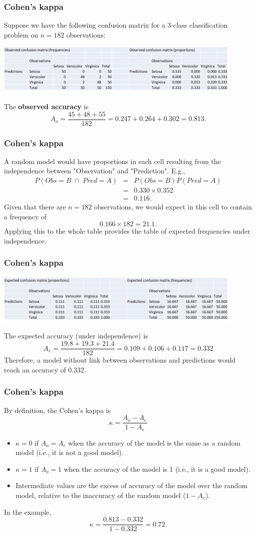 \begin{frame}
\frametitle{Cohen's kappa}
Suppose we have the following confusion matrix for a 3-class classification problem on $n=182$ observations:
\begin{center}
\includegraphics[width=12cm]{../Graphs/Kappa_Obs.png}
\end{center}
The {\bf observed accuracy} is 
$$
A_o = \frac{45+48+55}{182} = 0.247 + 0.264 + 0.302 = 0.813.
$$ 
\end{frame}
\begin{frame}
\frametitle{Cohen's kappa}
A random model would have proportions in each cell resulting from the independence between "Observation" and "Prediction". E.g.,
\begin{eqnarray*}
P(Obs=B\; \cap\; Pred=A) &=& P(Obs=B)P(Pred=A)\\
&=& 0.330 \times 0.352\\ 
&=& 0.116.
\end{eqnarray*}
Given that there are $n=182$ observations, we would expect in this cell to contain a frequency of
$$
0.166 \times 182 = 21.1.
$$
Applying this to the whole table provides the table of expected frequencies under independence.
\end{frame}
\begin{frame}
\frametitle{Cohen's kappa}
\begin{center}
\includegraphics[width=12cm]{../Graphs/Kappa_Exp.png}
\end{center}
The expected accuracy (under independence) is 
$$
A_e = \frac{19.8+19.3+21.4}{182} = 0.109 + 0.106 + 0.117 = 0.332
$$ 
Therefore, a model without link between observations and predictions would reach an accuracy of 0.332.  
\end{frame}
\begin{frame}
\frametitle{Cohen's kappa}
By definition, the Cohen's kappa is
$$
\kappa = \frac{A_o - A_e}{1-A_e} 
$$
\begin{itemize}
\item $\kappa = 0$ if $A_o=A_e$ when the accuracy of the model is the same as a random model (i.e., it is not a good model).
\item $\kappa = 1$ if $A_o=1$ when the accuracy of the model is 1 (i.e., it is a good model).
\item Intermediate values are the excess of accuracy of the model over the random model, relative to the inaccuracy of the random model ($1-A_e$).
\end{itemize}
In the example,
$$
\kappa =\frac{0.813 - 0.332}{1 - 0.332} = 0.72.
$$
\end{frame}
